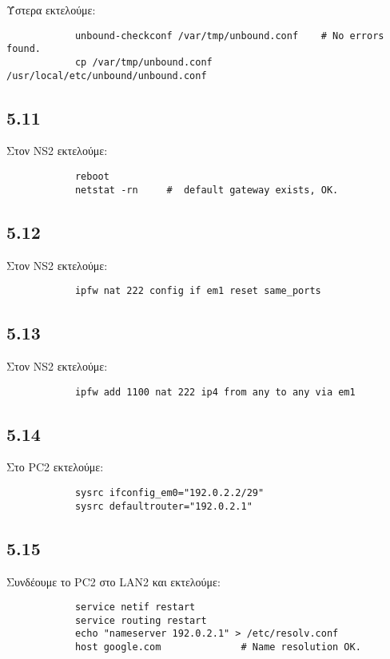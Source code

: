 \documentclass[a4paper, 12pt]{article}
\begin{document}
		Ύστερα εκτελούμε:
		
		\begin{verbatim}
			unbound-checkconf /var/tmp/unbound.conf    # No errors found.
			cp /var/tmp/unbound.conf /usr/local/etc/unbound/unbound.conf			
		\end{verbatim}

	\subsection*{5.11} 
		Στον NS2 εκτελούμε:
		
		\begin{verbatim}
			reboot
			netstat -rn     #  default gateway exists, OK.
		\end{verbatim}

	\subsection*{5.12}
		Στον NS2 εκτελούμε:
		
		\begin{verbatim}
			ipfw nat 222 config if em1 reset same_ports
		\end{verbatim}

	\subsection*{5.13}
		Στον NS2 εκτελούμε:
		
		\begin{verbatim}
			ipfw add 1100 nat 222 ip4 from any to any via em1
		\end{verbatim}

	\subsection*{5.14}
		Στο PC2 εκτελούμε:
		
		\begin{verbatim}
			sysrc ifconfig_em0="192.0.2.2/29"
			sysrc defaultrouter="192.0.2.1"
		\end{verbatim}

	\subsection*{5.15}
		Συνδέουμε το PC2 στο LAN2 και εκτελούμε:
		
		\begin{verbatim}
			service netif restart
			service routing restart
			echo "nameserver 192.0.2.1" > /etc/resolv.conf
			host google.com              # Name resolution OK.
		\end{verbatim}
\end{document}
